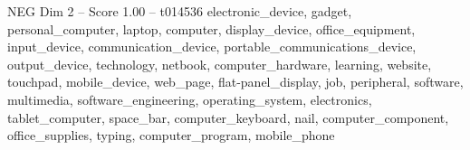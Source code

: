 \begin{textsample}{NEG Dim 2 – Score 1.00 – t014536}  \label{ex:f2_neg_004}
electronic\_device, gadget, personal\_computer, laptop, computer, display\_device, office\_equipment, input\_device, communication\_device, portable\_communications\_device, output\_device, technology, netbook, computer\_hardware, learning, website, touchpad, mobile\_device, web\_page, flat-panel\_display, job, peripheral, software, multimedia, software\_engineering, operating\_system, electronics, tablet\_computer, space\_bar, computer\_keyboard, nail, computer\_component, office\_supplies, typing, computer\_program, mobile\_phone

\end{textsample}
